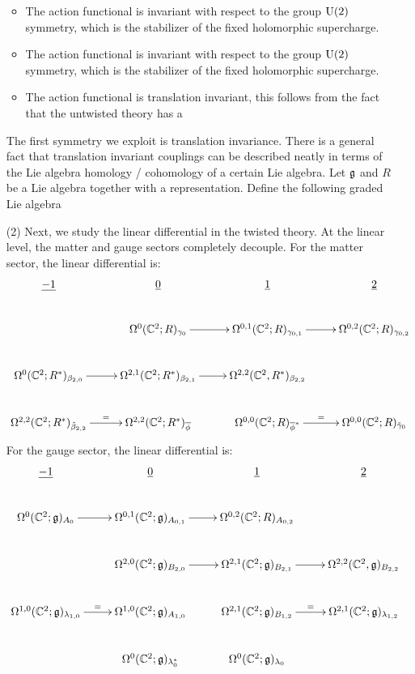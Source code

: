 \documentclass[10pt, oneside]{article}
\begin{document}
\begin{itemize}
\begin{itemize}
\item The action functional is invariant with respect to the group $\mathrm{U}(2)$ symmetry, which is the stabilizer of the fixed holomorphic supercharge.
\item The action functional is invariant with respect to the group ${\rm U}(2)$ symmetry, which is the stabilizer of the fixed holomorphic supercharge.
\item The action functional is translation invariant, this follows from the fact that the untwisted theory has a 
\end{itemize}

The first symmetry we exploit is translation invariance. 
There is a general fact that translation invariant couplings can be described neatly in terms of the Lie algebra homology / cohomology of a certain Lie algebra. 
Let $\mathfrak g$ and $R$ be a Lie algebra together with a representation.
Define the following graded Lie algebra
\item[(2)] Next, we study the linear differential in the twisted theory. 
At the linear level, the matter and gauge sectors completely decouple. 
For the matter sector, the linear differential is:
\[
\xymatrix{
\ul{-1} & \ul{0} & \ul{1} & \ul{2} \\
& \Omega^0(\CC^2; R)_{\gamma_0} \ar[r] & \Omega^{0,1}(\CC^2; R)_{\gamma_{0,1}} \ar[r] & \Omega^{0,2}(\CC^2; R)_{\gamma_{0,2} } \\
\Omega^0(\CC^2; R^*)_{\beta_{2,0}} \ar[r] & \Omega^{2,1}(\CC^2; R^*)_{\beta_{2,1}} \ar[r] & \Omega^{2,2}(\CC^2 , R^*)_{\beta_{2,2}} \\
\Omega^{2,2} (\CC^2; R^*)_{\Tilde{\beta}_{2,2}} \ar[r]^-{=}& \Omega^{2,2}(\CC^2; R^*)_{\Bar{\phi}} & \Omega^{0,0}(\CC^2; R)_{\Bar{\phi}^*} \ar[r]^-{=} & \Omega^{0,0}(\CC^2; R)_{\Tilde{\gamma}_0}
}
\]
For the gauge sector, the linear differential is:
\[
\xymatrix{
\ul{-1} & \ul{0} & \ul{1} & \ul{2} \\
\Omega^0(\CC^2; \fg)_{A_0} \ar[r] & \Omega^{0,1}(\CC^2; \fg)_{A_{0,1}} \ar[r] & \Omega^{0,2}(\CC^2; R)_{A_{0,2} } &  \\
& \Omega^{2,0}(\CC^2; \fg)_{B_{2,0}} \ar[r] & \Omega^{2,1}(\CC^2; \fg)_{B_{2,1}} \ar[r] & \Omega^{2,2}(\CC^2 , \fg)_{B_{2,2}} \\
\Omega^{1,0} (\CC^2; \fg)_{\lambda_{1,0}} \ar[r]^-{=} & \Omega^{1,0}(\CC^2; \fg)_{A_{1,0}} & \Omega^{2,1}(\CC^2; \fg)_{B_{1,2}} \ar[r]^-{=} & \Omega^{2,1}(\CC^2; \fg)_{\lambda_{1,2}} \\
& \Omega^0(\CC^2 ; \fg)_{\lambda_0^*} & \Omega^0(\CC^2 ; \fg)_{\lambda_0} & 
}
\]
\end{itemize}
\end{document}
